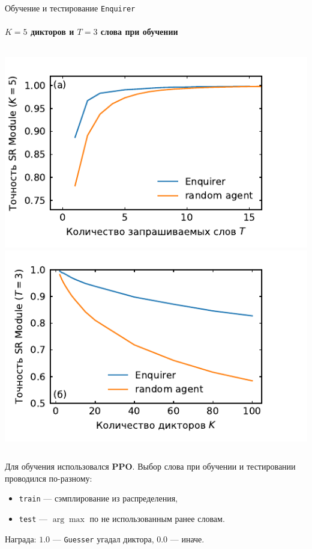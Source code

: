 \documentclass[aspectratio=43]{beamer}
\newcommand{\guesser}{\texttt{Guesser}}
\newcommand{\enquirer}{\texttt{Enquirer}}
\newcommand{\imgscale}{0.67}
\begin{document}
\begin{frame}[t]{Обучение и тестирование \enquirer{}}
    \framesubtitle{$K = 5$ дикторов  и $T = 3$ слова при обучении}
    \begin{columns}[T]
        \centering
        \mbox{\includegraphics[scale=\imgscale]{../plots/old/word_sweep_enq.pdf}}
        \mbox{\includegraphics[scale=\imgscale]{../plots/old/guest_sweep_enq.pdf}}
    \end{columns}\vspace*{1em}

    Для обучения использовался \textbf{PPO}. Выбор слова при обучении и
    тестировании проводился по-разному:
    \begin{itemize}
        \item \texttt{train} --- сэмплирование из распределения,
        \item \texttt{test} --- $\arg \max$ по не использованным ранее словам.
    \end{itemize}\vspace{1em}

    Награда: $1.0$ --- \guesser{} угадал диктора, $0.0$ --- иначе.
\end{frame}
\end{document}
